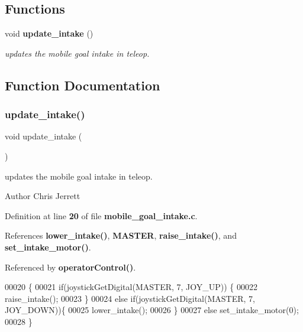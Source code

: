 \subsection*{Functions}
\begin{DoxyCompactItemize}
\item 
void \textbf{ update\+\_\+intake} ()
\begin{DoxyCompactList}\small\item\em updates the mobile goal intake in teleop. \end{DoxyCompactList}\end{DoxyCompactItemize}


\subsection{Function Documentation}
\mbox{\label{mobile__goal__intake_8h_a5d7bad8a208988af743fd2e68f111286}} 
\subsubsection{update\+\_\+intake()}
{\footnotesize\ttfamily void update\+\_\+intake (\begin{DoxyParamCaption}{ }\end{DoxyParamCaption})}



updates the mobile goal intake in teleop. 

\begin{DoxyAuthor}{Author}
Chris Jerrett 
\end{DoxyAuthor}


Definition at line \textbf{ 20} of file \textbf{ mobile\+\_\+goal\+\_\+intake.\+c}.



References \textbf{ lower\+\_\+intake()}, \textbf{ M\+A\+S\+T\+ER}, \textbf{ raise\+\_\+intake()}, and \textbf{ set\+\_\+intake\+\_\+motor()}.



Referenced by \textbf{ operator\+Control()}.


\begin{DoxyCode}
00020                      \{
00021   \textcolor{keywordflow}{if}(joystickGetDigital(MASTER, 7, JOY\_UP)) \{
00022     raise_intake();
00023   \}
00024   \textcolor{keywordflow}{else} \textcolor{keywordflow}{if}(joystickGetDigital(MASTER, 7, JOY\_DOWN))\{
00025     lower_intake();
00026   \}
00027   \textcolor{keywordflow}{else} set_intake_motor(0);
00028 \}
\end{DoxyCode}

